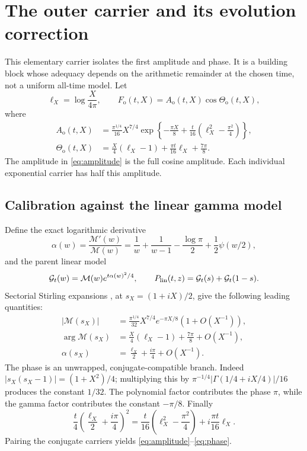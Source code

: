 \documentclass[11pt]{article}
\newcommand{\Mc}{\mathcal M}
\newcommand{\Gc}{\mathcal G}
\numberwithin{equation}{section}
\begin{document}
\section{The outer carrier and its evolution correction}
\label{sec:cosine}
This elementary carrier isolates the first amplitude and phase.
It is a building block whose adequacy depends on the arithmetic
remainder at the chosen time, not a uniform all-time model. Let
\begin{equation}
\ell_X=\log\frac{X}{4\pi},\qquad
F_{\mathrm o}(t,X)=A_{\mathrm o}(t,X)\cos\Theta_{\mathrm o}(t,X),
\label{eq:outer}
\end{equation}
where
\begin{align}
A_{\mathrm o}(t,X)&=\frac{\pi^{1/4}}{16}X^{7/4}
\exp\left\{-\frac{\pi X}{8}
             +\frac t{16}\left(\ell_X^2-\frac{\pi^2}{4}\right)\right\},
\label{eq:amplitude}\\
\Theta_{\mathrm o}(t,X)&=\frac X4(\ell_X-1)
                         +\frac{\pi t}{16}\ell_X+\frac{7\pi}{8}.
\label{eq:phase}
\end{align}
The amplitude in \eqref{eq:amplitude} is the full cosine amplitude.
Each individual exponential carrier has half this amplitude.

\subsection{Calibration against the linear gamma model}
Define the exact logarithmic derivative
\begin{equation}
\alpha(w)=\frac{\Mc'(w)}{\Mc(w)}
=\frac1w+\frac1{w-1}-\frac{\log\pi}{2}+\frac12\psi(w/2),
\end{equation}
and the parent linear model
\begin{equation}
\Gc_t(w)=\Mc(w)e^{t\alpha(w)^2/4},\qquad
P_{\rm lin}(t,z)=\Gc_t(s)+\Gc_t(1-s). \label{eq:linear}
\end{equation}
Sectorial Stirling expansions \cite{dlmf-gamma}, at \(s_X=(1+iX)/2\),
give the following leading quantities:
\begin{align}
|\Mc(s_X)|&=\frac{\pi^{1/4}}{32}X^{7/4}e^{-\pi X/8}
                          (1+O(X^{-1})), \label{eq:gamma-amplitude}\\
\arg\Mc(s_X)&=\frac X4(\ell_X-1)+\frac{7\pi}{8}+O(X^{-1}),\\
\alpha(s_X)&=\frac{\ell_X}{2}+\frac{i\pi}{4}+O(X^{-1}).
\label{eq:alpha-leading}
\end{align}
The phase is an unwrapped, conjugate-compatible branch.
Indeed \(|s_X(s_X-1)|=(1+X^2)/4\); multiplying this by
\(\pi^{-1/4}|\Gamma(1/4+iX/4)|/16\) produces the constant \(1/32\).
The polynomial factor contributes the phase \(\pi\), while the gamma
factor contributes the constant \(-\pi/8\).
Finally
\[
\frac t4\left(\frac{\ell_X}{2}+\frac{i\pi}{4}\right)^2
=\frac t{16}\left(\ell_X^2-\frac{\pi^2}{4}\right)
 +i\frac{\pi t}{16}\ell_X.
\]
Pairing the conjugate carriers yields
\eqref{eq:amplitude}--\eqref{eq:phase}.
\end{document}

